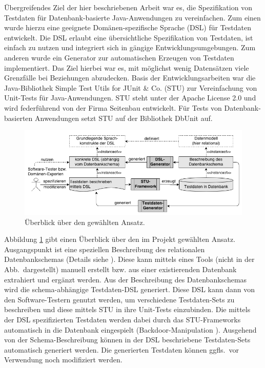 Übergreifendes Ziel der hier beschriebenen Arbeit \cite{MT:Moll:2013} war es, die Spezifikation von Testdaten für Datenbank-basierte Java-Anwendungen zu vereinfachen.
%
Zum einen wurde hierzu eine geeignete Domänen-spezifische Sprache (DSL) für Testdaten entwickelt.
%
Die DSL erlaubt eine  übersichtliche Spezifikation von Testdaten, ist einfach zu nutzen und integriert sich in gängige Entwicklungsumgebungen.
%
Zum anderen wurde ein Generator zur automatischen Erzeugen von Testdaten implementiert. 
%
Das Ziel hierbei war es, mit möglichst wenig Datensätzen viele Grenzfälle bei Beziehungen abzudecken.
%
Basis der Entwicklungsarbeiten war die Java-Bibliothek Simple Test Utils for JUnit \& Co. (STU) zur Vereinfachung von Unit-Tests für Java-Anwendungen. STU steht unter der Apache License 2.0 und wird federführend von der Firma Seitenbau entwickelt. Für Tests von Datenbank-basierten Anwendungen setzt STU auf der Bibliothek DbUnit auf. 


\begin{figure}[tb]
	\begin{center}
		\includegraphics[width=12.5cm]{images/ansatz.png}
		\caption{\label{ansatz}Überblick über den gewählten Ansatz.}
	\end{center}
\end{figure}

Abbildung \ref{ansatz} gibt einen Überblick über den im Projekt gewählten Ansatz.
%
Ausgangspunkt ist eine speziellen Beschreibung des relationalen Datenbankschemas (Details siehe \cite{MT:Moll:2013}).
%
Diese kann mittels eines Tools (nicht in der Abb.~dargestellt) manuell erstellt bzw. aus einer existierenden Datenbank extrahiert und ergänzt werden.
%
Aus der Beschreibung des Datenbankschemas wird die schema-abhängige Testdaten-DSL generiert. 
%
Diese DSL kann dann von den Software-Testern genutzt werden, um verschiedene Testdaten-Sets zu beschreiben und diese mittels STU in ihre Unit-Tests einzubinden.
%
Die mittels der DSL spezifizierten Testdaten werden dabei durch das STU-Frameworks automatisch in die Datenbank eingespielt (Backdoor-Manipulation \cite{XUNIT_TEST_PATTERNS}). 
%
Ausgehend von der Schema-Beschreibung können in der DSL beschriebene Test\-da\-ten-Sets automatisch generiert werden. Die generierten Testdaten können ggfls.~vor Verwendung noch modifiziert werden.
%
%
%





	




